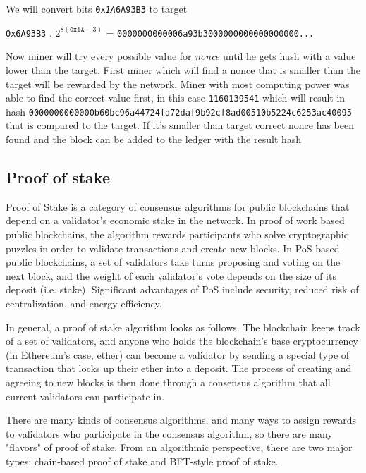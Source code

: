 We will convert bits \texttt{0x\emph{1A}6A93B3} to target  
\begin{center}
    \texttt {0x6A93B3} . $2^{8(\texttt{0x1A} - 3)}$ = \texttt{0000000000006a93b3000000000000000000...}
\end{center}

Now miner will try every possible value for \emph{nonce} until he gets hash with a value lower than the target. First miner which will find a nonce that is smaller than the target will be rewarded by the network. Miner with most computing power was able to find the correct value first, in this case \texttt{1160139541} which will result in hash \texttt{0000000000000b60bc96a44724fd72daf9b92cf8ad00510b5224c6253ac40095}  that is compared to the target. If it's smaller than target  correct nonce has been found and the block can be added to the ledger with the result hash


\subsection{Proof of stake}

Proof of Stake is a category of consensus algorithms for public blockchains that depend on a validator's economic stake in the network. In proof of work based public blockchains, the algorithm rewards participants who solve cryptographic puzzles in order to validate transactions and create new blocks. In PoS based public blockchains, a set of validators take turns proposing and voting on the next block, and the weight of each validator's vote depends on the size of its deposit (i.e. stake). Significant advantages of PoS include security, reduced risk of centralization, and energy efficiency.

In general, a proof of stake algorithm looks as follows. The blockchain keeps track of a set of validators, and anyone who holds the blockchain's base cryptocurrency (in Ethereum's case, ether) can become a validator by sending a special type of transaction that locks up their ether into a deposit. The process of creating and agreeing to new blocks is then done through a consensus algorithm that all current validators can participate in.

There are many kinds of consensus algorithms, and many ways to assign rewards to validators who participate in the consensus algorithm, so there are many "flavors" of proof of stake. From an algorithmic perspective, there are two major types: chain-based proof of stake and BFT-style proof of stake.

